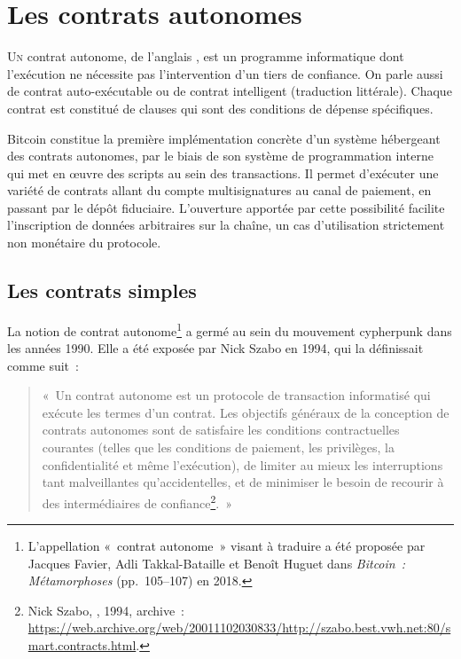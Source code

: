
\chapter{Les contrats autonomes}
\label{ch:contrats}
\label{enotezch:13}

\lettrine[]{U}n contrat autonome, de l'anglais , est un programme informatique dont l'exécution ne nécessite pas l'intervention d'un tiers de confiance. On parle aussi de contrat auto-exécutable ou de contrat intelligent (traduction littérale). Chaque contrat est constitué de clauses qui sont des conditions de dépense spécifiques.

Bitcoin constitue la première implémentation concrète d'un système hébergeant des contrats autonomes, par le biais de son système de programmation interne qui met en œuvre des scripts au sein des transactions. Il permet d'exécuter une variété de contrats allant du compte multisignatures au canal de paiement, en passant par le dépôt fiduciaire. L'ouverture apportée par cette possibilité facilite l'inscription de données arbitraires sur la chaîne, un cas d'utilisation strictement non monétaire du protocole.

\section*{Les contrats simples}

La notion de contrat autonome\footnote{L'appellation «~contrat autonome~» visant à traduire  a été proposée par Jacques Favier, Adli Takkal-Bataille et Benoît Huguet dans \emph{Bitcoin~: Métamorphoses} (pp.~105--107) en 2018.} a germé au sein du mouvement cypherpunk dans les années 1990. Elle a été exposée par Nick Szabo en 1994, qui la définissait comme suit~:

\begin{quote}
«~Un contrat autonome est un protocole de transaction informatisé qui exécute les termes d'un contrat. Les objectifs généraux de la conception de contrats autonomes sont de satisfaire les conditions contractuelles courantes (telles que les conditions de paiement, les privilèges, la confidentialité et même l'exécution), de limiter au mieux les interruptions tant malveillantes qu'accidentelles, et de minimiser le besoin de recourir à des intermédiaires de confiance\footnote{Nick Szabo, , 1994, archive~: \url{https://web.archive.org/web/20011102030833/http://szabo.best.vwh.net:80/smart.contracts.html}.}.~»
\end{quote} %

